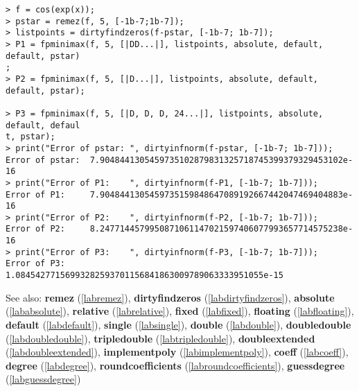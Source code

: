 \begin{center}\begin{minipage}{15cm}\begin{Verbatim}[frame=single]
> f = cos(exp(x));
> pstar = remez(f, 5, [-1b-7;1b-7]);
> listpoints = dirtyfindzeros(f-pstar, [-1b-7; 1b-7]);
> P1 = fpminimax(f, 5, [|DD...|], listpoints, absolute, default, default, pstar)
;
> P2 = fpminimax(f, 5, [|D...|], listpoints, absolute, default, default, pstar);

> P3 = fpminimax(f, 5, [|D, D, D, 24...|], listpoints, absolute, default, defaul
t, pstar);
> print("Error of pstar: ", dirtyinfnorm(f-pstar, [-1b-7; 1b-7]));
Error of pstar:  7.9048441305459735102879831325718745399379329453102e-16
> print("Error of P1:    ", dirtyinfnorm(f-P1, [-1b-7; 1b-7]));
Error of P1:     7.9048441305459735159848647089192667442047469404883e-16
> print("Error of P2:    ", dirtyinfnorm(f-P2, [-1b-7; 1b-7]));
Error of P2:     8.2477144579950871061147021597406077993657714575238e-16
> print("Error of P3:    ", dirtyinfnorm(f-P3, [-1b-7; 1b-7]));
Error of P3:     1.08454277156993282593701156841863009789063333951055e-15
\end{Verbatim}
\end{minipage}\end{center}
See also: \textbf{remez} (\ref{labremez}), \textbf{dirtyfindzeros} (\ref{labdirtyfindzeros}), \textbf{absolute} (\ref{lababsolute}), \textbf{relative} (\ref{labrelative}), \textbf{fixed} (\ref{labfixed}), \textbf{floating} (\ref{labfloating}), \textbf{default} (\ref{labdefault}), \textbf{single} (\ref{labsingle}), \textbf{double} (\ref{labdouble}), \textbf{doubledouble} (\ref{labdoubledouble}), \textbf{tripledouble} (\ref{labtripledouble}), \textbf{doubleextended} (\ref{labdoubleextended}), \textbf{implementpoly} (\ref{labimplementpoly}), \textbf{coeff} (\ref{labcoeff}), \textbf{degree} (\ref{labdegree}), \textbf{roundcoefficients} (\ref{labroundcoefficients}), \textbf{guessdegree} (\ref{labguessdegree})
